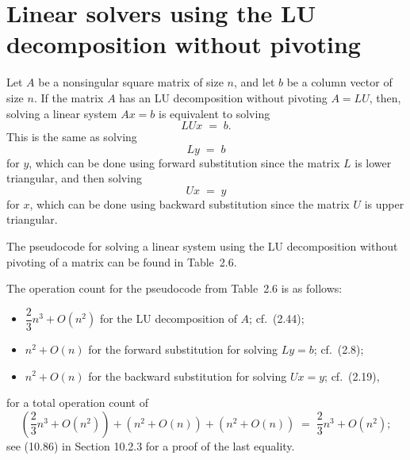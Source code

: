 
\section{Linear solvers using the LU decomposition without pivoting}

Let $A$ be a nonsingular square matrix of size $n$, and let $b$ be a column
vector of size $n$. If the matrix $A$ has an LU decomposition without
pivoting $A=LU$, then, solving a linear system $Ax=b$ is equivalent to
solving
\[
LUx \;=\; b.
\]
This is the same as solving
\[
Ly \;=\; b
\]
for $y$, which can be done using forward substitution since the matrix $L$
is lower triangular, and then solving
\[
Ux \;=\; y
\]
for $x$, which can be done using backward substitution since the matrix $U$
is upper triangular.

The pseudocode for solving a linear system using the LU decomposition
without pivoting of a matrix can be found in Table~2.6.

\begin{table}[H]
\centering
\caption{Linear solver using LU decomposition without pivoting}
\end{table}

The operation count for the pseudocode from Table~2.6 is as follows:
\begin{itemize}
\item[$\bullet$] $\dfrac{2}{3}n^3+O(n^2)$ for the LU decomposition of $A$; cf.\ (2.44);
\item[$\bullet$] $n^2+O(n)$ for the forward substitution for solving $Ly=b$; cf.\ (2.8);
\item[$\bullet$] $n^2+O(n)$ for the backward substitution for solving $Ux=y$; cf.\ (2.19),
\end{itemize}
for a total operation count of
\[
\left(\frac{2}{3}n^3+O(n^2)\right) + \left(n^2+O(n)\right) + \left(n^2+O(n)\right) \;=\; \frac{2}{3}n^3+O(n^2);
\]
see (10.86) in Section 10.2.3 for a proof of the last equality.

